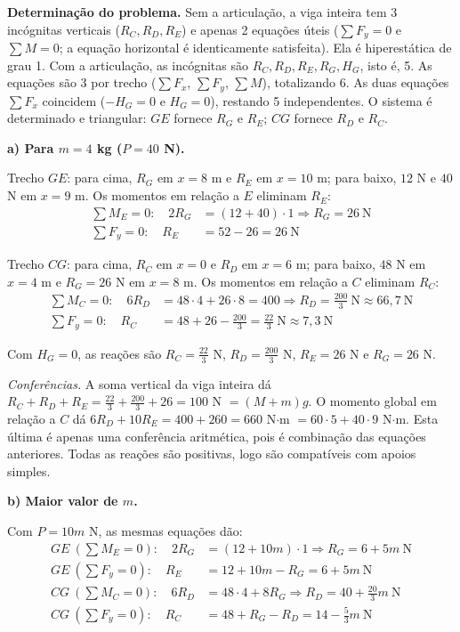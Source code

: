 \documentclass{article}%
\begin{document}
\textbf{Determinação do problema.} Sem a articulação, a viga inteira tem 3 incógnitas verticais ($R_C,R_D,R_E$) e apenas 2 equações úteis ($\sum F_y=0$ e $\sum M=0$; a equação horizontal é identicamente satisfeita). Ela é hiperestática de grau 1. Com a articulação, as incógnitas são $R_C,R_D,R_E,R_G,H_G$, isto é, 5. As equações são 3 por trecho ($\sum F_x$, $\sum F_y$, $\sum M$), totalizando 6. As duas equações $\sum F_x$ coincidem ($-H_G=0$ e $H_G=0$), restando 5 independentes. O sistema é determinado e triangular: $GE$ fornece $R_G$ e $R_E$; $CG$ fornece $R_D$ e $R_C$.

\textbf{a) Para $m=4$ kg ($P=40$ N).}

Trecho $GE$: para cima, $R_G$ em $x=8$ m e $R_E$ em $x=10$ m; para baixo, $12$ N e $40$ N em $x=9$ m. Os momentos em relação a $E$ eliminam $R_E$:
\begin{align*}
\sum M_E=0:\quad 2R_G &= (12+40)\cdot 1 \Rightarrow R_G=26\ \text{N}\\
\sum F_y=0:\quad R_E &= 52-26 = 26\ \text{N}
\end{align*}

Trecho $CG$: para cima, $R_C$ em $x=0$ e $R_D$ em $x=6$ m; para baixo, $48$ N em $x=4$ m e $R_G=26$ N em $x=8$ m. Os momentos em relação a $C$ eliminam $R_C$:
\begin{align*}
\sum M_C=0:\quad 6R_D &= 48\cdot 4+26\cdot 8 = 400 \Rightarrow R_D=\frac{200}{3}\ \text{N}\approx 66{,}7\ \text{N}\\
\sum F_y=0:\quad R_C &= 48+26-\frac{200}{3}=\frac{22}{3}\ \text{N}\approx 7{,}3\ \text{N}
\end{align*}

Com $H_G=0$, as reações são $R_C=\frac{22}{3}$ N, $R_D=\frac{200}{3}$ N, $R_E=26$ N e $R_G=26$ N.

\emph{Conferências.} A soma vertical da viga inteira dá $R_C+R_D+R_E=\frac{22}{3}+\frac{200}{3}+26=100$ N $=(M+m)g$. O momento global em relação a $C$ dá $6R_D+10R_E=400+260=660$ N$\cdot$m $=60\cdot 5+40\cdot 9$ N$\cdot$m. Esta última é apenas uma conferência aritmética, pois é combinação das equações anteriores. Todas as reações são positivas, logo são compatíveis com apoios simples.

\textbf{b) Maior valor de $m$.}

Com $P=10m$ N, as mesmas equações dão:
\begin{align*}
GE\ (\textstyle\sum M_E=0):\quad 2R_G &= (12+10m)\cdot 1 \Rightarrow R_G=6+5m\ \text{N}\\
GE\ (\textstyle\sum F_y=0):\quad R_E &= 12+10m-R_G = 6+5m\ \text{N}\\
CG\ (\textstyle\sum M_C=0):\quad 6R_D &= 48\cdot 4+8R_G \Rightarrow R_D=40+\frac{20}{3}m\ \text{N}\\
CG\ (\textstyle\sum F_y=0):\quad R_C &= 48+R_G-R_D = 14-\frac{5}{3}m\ \text{N}
\end{align*}
\end{document}
